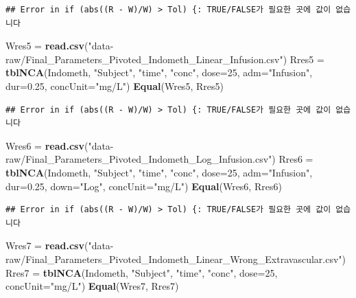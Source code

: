 \documentclass[12pt,]{krantz}
\newenvironment{Shaded}{\begin{snugshade}}{\end{snugshade}}
\newcommand{\DataTypeTok}[1]{\textcolor[rgb]{0.13,0.29,0.53}{#1}}
\newcommand{\DecValTok}[1]{\textcolor[rgb]{0.00,0.00,0.81}{#1}}
\newcommand{\FloatTok}[1]{\textcolor[rgb]{0.00,0.00,0.81}{#1}}
\newcommand{\KeywordTok}[1]{\textcolor[rgb]{0.13,0.29,0.53}{\textbf{#1}}}
\newcommand{\NormalTok}[1]{#1}
\newcommand{\StringTok}[1]{\textcolor[rgb]{0.31,0.60,0.02}{#1}}
\begin{document}
\begin{verbatim}
## Error in if (abs((R - W)/W) > Tol) {: TRUE/FALSE가 필요한 곳에 값이 없습니다
\end{verbatim}

\begin{Shaded}
\begin{Highlighting}[]
\NormalTok{Wres5 =}\StringTok{ }\KeywordTok{read.csv}\NormalTok{(}\StringTok{"data-raw/Final_Parameters_Pivoted_Indometh_Linear_Infusion.csv"}\NormalTok{)}
\NormalTok{Rres5 =}\StringTok{ }\KeywordTok{tblNCA}\NormalTok{(Indometh, }\StringTok{"Subject"}\NormalTok{, }\StringTok{"time"}\NormalTok{, }\StringTok{"conc"}\NormalTok{, }\DataTypeTok{dose=}\DecValTok{25}\NormalTok{, }\DataTypeTok{adm=}\StringTok{"Infusion"}\NormalTok{, }
               \DataTypeTok{dur=}\FloatTok{0.25}\NormalTok{, }\DataTypeTok{concUnit=}\StringTok{"mg/L"}\NormalTok{)}
\KeywordTok{Equal}\NormalTok{(Wres5, Rres5)}
\end{Highlighting}
\end{Shaded}

\begin{verbatim}
## Error in if (abs((R - W)/W) > Tol) {: TRUE/FALSE가 필요한 곳에 값이 없습니다
\end{verbatim}

\begin{Shaded}
\begin{Highlighting}[]
\NormalTok{Wres6 =}\StringTok{ }\KeywordTok{read.csv}\NormalTok{(}\StringTok{"data-raw/Final_Parameters_Pivoted_Indometh_Log_Infusion.csv"}\NormalTok{)}
\NormalTok{Rres6 =}\StringTok{ }\KeywordTok{tblNCA}\NormalTok{(Indometh, }\StringTok{"Subject"}\NormalTok{, }\StringTok{"time"}\NormalTok{, }\StringTok{"conc"}\NormalTok{, }\DataTypeTok{dose=}\DecValTok{25}\NormalTok{, }\DataTypeTok{adm=}\StringTok{"Infusion"}\NormalTok{, }
               \DataTypeTok{dur=}\FloatTok{0.25}\NormalTok{, }\DataTypeTok{down=}\StringTok{"Log"}\NormalTok{, }\DataTypeTok{concUnit=}\StringTok{"mg/L"}\NormalTok{)}
\KeywordTok{Equal}\NormalTok{(Wres6, Rres6)}
\end{Highlighting}
\end{Shaded}

\begin{verbatim}
## Error in if (abs((R - W)/W) > Tol) {: TRUE/FALSE가 필요한 곳에 값이 없습니다
\end{verbatim}

\begin{Shaded}
\begin{Highlighting}[]
\NormalTok{Wres7 =}\StringTok{ }\KeywordTok{read.csv}\NormalTok{(}\StringTok{"data-raw/Final_Parameters_Pivoted_Indometh_Linear_Wrong_Extravascular.csv"}\NormalTok{)}
\NormalTok{Rres7 =}\StringTok{ }\KeywordTok{tblNCA}\NormalTok{(Indometh, }\StringTok{"Subject"}\NormalTok{, }\StringTok{"time"}\NormalTok{, }\StringTok{"conc"}\NormalTok{, }\DataTypeTok{dose=}\DecValTok{25}\NormalTok{, }\DataTypeTok{concUnit=}\StringTok{"mg/L"}\NormalTok{)}
\KeywordTok{Equal}\NormalTok{(Wres7, Rres7)}
\end{Highlighting}
\end{Shaded}
\end{document}
